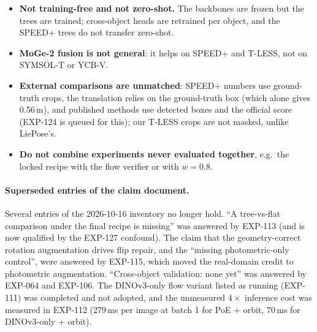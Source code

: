 \begin{itemize}
\item \textbf{Not training-free and not zero-shot.} The backbones are frozen but the trees are trained; cross-object heads are retrained per object, and the SPEED+ trees do not transfer zero-shot.
\item \textbf{MoGe-2 fusion is not general}: it helps on SPEED+ and T-LESS, not on SYMSOL-T or YCB-V.
\item \textbf{External comparisons are unmatched}: SPEED+ numbers use ground-truth crops, the translation relies on the ground-truth box (which alone gives 0.56\,m), and published methods use detected boxes and the official score (EXP-124 is queued for this); our T-LESS crops are not masked, unlike LiePose's.
\item \textbf{Do not combine experiments never evaluated together}, e.g.\ the locked recipe with the flow verifier or with $w=0.8$.
\end{itemize}

\paragraph{Superseded entries of the claim document.}
Several entries of the 2026-10-16 inventory no longer hold. ``A tree-vs-flat comparison under the final recipe is missing'' was answered by EXP-113 (and is now qualified by the EXP-127 confound). The claim that the geometry-correct rotation augmentation drives flip repair, and the ``missing photometric-only control'', were answered by EXP-115, which moved the real-domain credit to photometric augmentation. ``Cross-object validation: none yet'' was answered by EXP-064 and EXP-106. The DINOv3-only flow variant listed as running (EXP-111) was completed and not adopted, and the unmeasured $4\times$ inference cost was measured in EXP-112 (279\,ms per image at batch 1 for PoE + orbit, 70\,ms for DINOv3-only + orbit).
